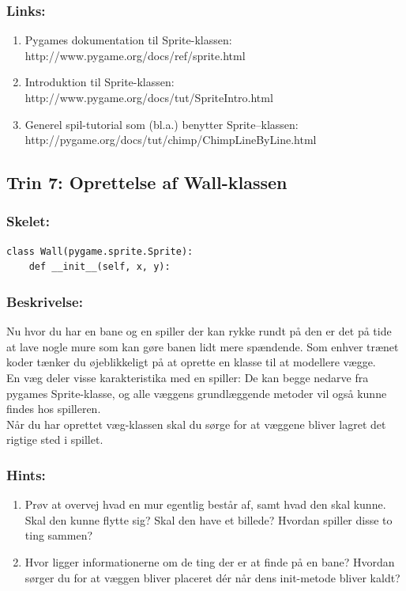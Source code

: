 \documentclass[10pt,a4paper,danish]{article}
\begin{document}
\subsubsection{Links:}
\begin{enumerate}
\item Pygames dokumentation til Sprite-klassen: http://www.pygame.org/docs/ref/sprite.html
\item Introduktion til Sprite-klassen: http://www.pygame.org/docs/tut/SpriteIntro.html
\item Generel spil-tutorial som (bl.a.) benytter Sprite--klassen: http://pygame.org/docs/tut/chimp/ChimpLineByLine.html
\end{enumerate}

\subsection{Trin 7: Oprettelse af Wall-klassen}
\subsubsection{Skelet:} 
\begin{verbatim}
class Wall(pygame.sprite.Sprite):
    def __init__(self, x, y):
\end{verbatim}

\subsubsection{Beskrivelse:}
Nu hvor du har en bane og en spiller der kan rykke
rundt på den er det på tide at lave nogle mure som 
kan gøre banen lidt mere spændende. Som enhver trænet
koder tænker du øjeblikkeligt på at oprette en klasse
til at modellere vægge. 
\\
En væg deler visse karakteristika med en spiller:
De kan begge nedarve fra pygames Sprite-klasse, og 
alle væggens grundlæggende metoder vil også kunne
findes hos spilleren. 
\\
Når du har oprettet væg-klassen skal du sørge
for at væggene bliver lagret det rigtige sted
i spillet. 

\subsubsection{Hints:}
\begin{enumerate} 
\item Prøv at overvej hvad en mur egentlig består af,
   samt hvad den skal kunne. Skal den kunne flytte sig?
   Skal den have et billede? Hvordan spiller disse 
   to ting sammen?
\item Hvor ligger informationerne om de ting der er 
   at finde på en bane? Hvordan sørger du for at
   væggen bliver placeret dér når dens init-metode
   bliver kaldt?
\end{enumerate}
\end{document}
